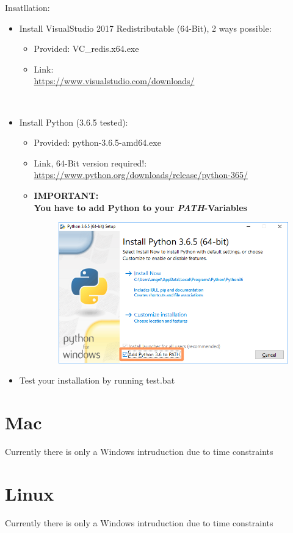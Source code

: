 \documentclass[]{article}
\begin{document}
Insatllation:
\begin{itemize}
	\item 
	Install VisualStudio 2017 Redistributable (64-Bit), 2 ways possible:
	\begin{itemize}
		\item Provided: VC\_redis.x64.exe
		\item Link:\\ \url{https://www.visualstudio.com/downloads/}
	\end{itemize}
	
	\mbox{}\\
	\item 
	Install Python (3.6.5 tested):
	\begin{itemize}
		\item Provided: python-3.6.5-amd64.exe   
		\item Link, 64-Bit version required!:\\ \url{https://www.python.org/downloads/release/python-365/} 
		\item \textbf{IMPORTANT:\\You have to add Python to your \textit{PATH}-Variables}
		\begin{figure}[H]
			\includegraphics[width=\linewidth]{pythonPathVariable.png}
		\end{figure}
	\end{itemize}

	\item Test your installation by running test.bat
	
\end{itemize}


\newpage
\section{Mac}\label{Mac}

Currently there is only a Windows  intruduction due to time constraints

\newpage
\section{Linux}\label{Linux}

Currently there is only a Windows  intruduction due to time constraints
\end{document}
